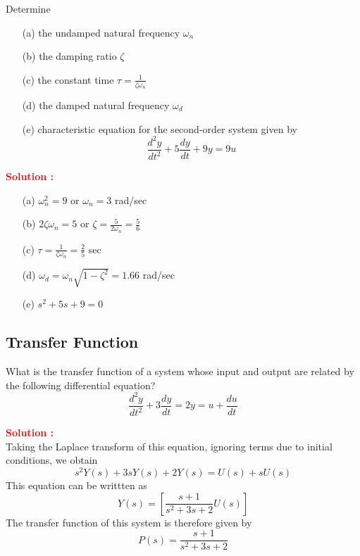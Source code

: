 \documentclass[12pt]{article}
\begin{document}
Determine
\begin{itemize}
    \item[(a)] the undamped natural frequency \(\omega_n\)
    \item[(b)] the damping ratio \(\zeta\)
    \item[(c)] the constant time \(\tau = \frac{1}{\zeta \omega_n}\)
    \item[(d)] the damped natural frequency \(\omega_d\)
    \item[(e)] characteristic equation for the second-order system given by
    \begin{equation}
        \frac{d^2y}{dt^2} + 5 \frac{dy}{dt} + 9 y = 9u
    \end{equation}
\end{itemize}

\textbf{\textcolor{red}{Solution :}} \\

\begin{itemize}
    \item[(a)] \(\omega_n^2 = 9\) or \(\omega_n = 3\) rad/sec
    \item[(b)] \(2\zeta \omega_n = 5\) or \(\zeta = \frac{5}{2\omega_n} = \frac{5}{6}\)
    \item[(c)] \(\tau = \frac{1}{\zeta \omega_n} = \frac{2}{5}\) sec
    \item[(d)] \(\omega_d = \omega_n \sqrt{1-\zeta^2} = 1.66\) rad/sec
    \item[(e)] \(s^2+5s+9 = 0\)
\end{itemize}

\clearpage
\subsection{Transfer Function}

What is the transfer function of a system whose input and output are related by the following differential equation?
\begin{equation}
    \frac{d^2y}{dt^2} + 3\frac{dy}{dt} = 2y = u + \frac{du}{dt}
\end{equation}

\textbf{\textcolor{red}{Solution :}} \\
Taking the Laplace transform of this equation, ignoring terms due to initial conditions, we obtain
\begin{equation}
    s^2 Y(s) + 3sY(s) + 2Y(s) = U(s) + s U(s)
\end{equation}
This equation can be writtten as 
\begin{equation}
    Y(s) = \left[ \frac{s+1}{s^2+3s+2} U(s) \right]
\end{equation}
The transfer function of this system is therefore given by
\begin{equation}
    P(s) = \frac{s+1}{s^2+3s+2}
\end{equation}
\end{document}
